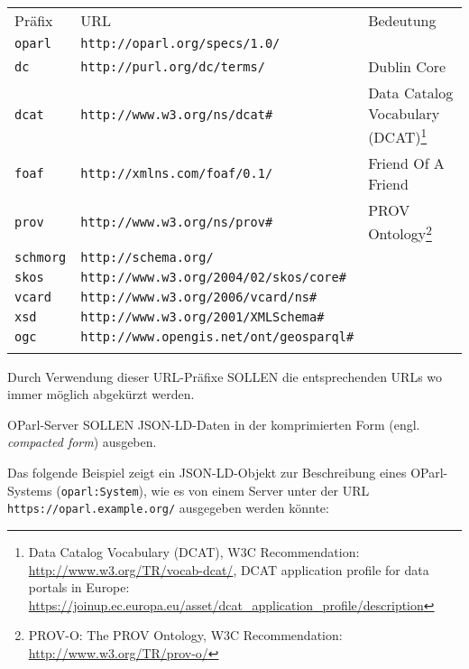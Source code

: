 \documentclass[,a4paper]{article}
\begin{document}
\begin{longtable}[c]{@{}lll@{}}
\toprule\addlinespace
Präfix & URL & Bedeutung
\\\addlinespace
\midrule\endhead
\texttt{oparl} & \texttt{http://oparl.org/specs/1.0/}
\\\addlinespace
\texttt{dc} & \texttt{http://purl.org/dc/terms/} & Dublin Core
\\\addlinespace
\texttt{dcat} & \texttt{http://www.w3.org/ns/dcat\#} & Data Catalog
Vocabulary (DCAT)\footnote{Data Catalog Vocabulary (DCAT), W3C
  Recommendation: \url{http://www.w3.org/TR/vocab-dcat/}, DCAT
  application profile for data portals in Europe:
  \url{https://joinup.ec.europa.eu/asset/dcat_application_profile/description}}
\\\addlinespace
\texttt{foaf} & \texttt{http://xmlns.com/foaf/0.1/} & Friend Of A Friend
\\\addlinespace
\texttt{prov} & \texttt{http://www.w3.org/ns/prov\#} & PROV
Ontology\footnote{PROV-O: The PROV Ontology, W3C Recommendation:
  \url{http://www.w3.org/TR/prov-o/}}
\\\addlinespace
\texttt{schmorg} & \texttt{http://schema.org/}
\\\addlinespace
\texttt{skos} & \texttt{http://www.w3.org/2004/02/skos/core\#}
\\\addlinespace
\texttt{vcard} & \texttt{http://www.w3.org/2006/vcard/ns\#}
\\\addlinespace
\texttt{xsd} & \texttt{http://www.w3.org/2001/XMLSchema\#}
\\\addlinespace
\texttt{ogc} & \texttt{http://www.opengis.net/ont/geosparql\#}
\\\addlinespace
\bottomrule
\end{longtable}

Durch Verwendung dieser URL-Präfixe SOLLEN die entsprechenden URLs wo
immer möglich abgekürzt werden.

OParl-Server SOLLEN JSON-LD-Daten in der komprimierten Form (engl.
\emph{compacted form}) ausgeben.

Das folgende Beispiel zeigt ein JSON-LD-Objekt zur Beschreibung eines
OParl-Systems (\texttt{oparl:System}), wie es von einem Server unter der
URL \texttt{https://oparl.example.org/} ausgegeben werden könnte:
\end{document}
